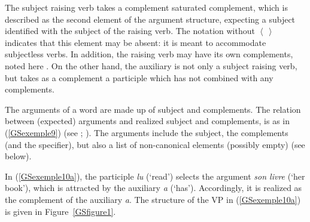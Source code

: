\documentclass[output=paper
	        ,collection
	        ,collectionchapter
 	        ,biblatex
                ,babelshorthands
                ,newtxmath
                ,draftmode
                ,colorlinks, citecolor=brown
]{langscibook}
\begin{document}
{\begin{exe}
\begin{xlist}
	\end{xlist}
\end{exe}

The subject raising verb takes a complement saturated complement, which is described as the second element of the argument structure, expecting a subject  identified with the subject of the raising verb. The notation  without $\left< \, \right>$ indicates that this element may be absent: it is meant to accommodate subjectless verbs. In addition, the raising verb may have its own complements, noted here . On the other hand, the auxiliary is not only a subject raising verb, but takes as a complement a participle which has not combined with any complements.

The arguments of a word are made up of subject and complements. The relation between (expected) arguments and realized subject and complements, is as in (\ref{GSexemple9}) (see \citealt[171]{GSag2000a-u}; \citealt{BMS2001a-unlinked}). The arguments include the subject, the complements (and the specifier), but also a list of non-canonical elements (possibly empty) (see below).

\begin{exe}
\end{exe}

In (\ref{GSexemple10a}), the participle \emph{lu} (`read') selects the argument \emph{son livre} (`her book'), which is attracted by the auxiliary \emph{a} (`has'). Accordingly, it is realized as the complement of the auxiliary \emph{a}. The structure of the VP in (\ref{GSexemple10a}) is given in Figure~\ref{GSfigure1}.

}
\end{document}
